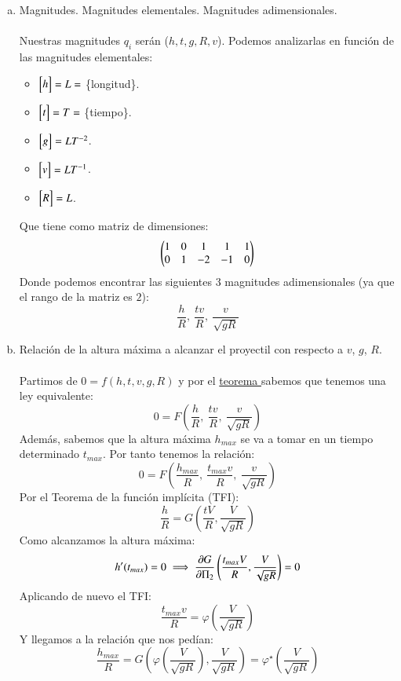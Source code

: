 \begin{ex}[H1.4]$ $
    \begin{enumerate}[a)]
        \item Magnitudes. Magnitudes elementales. Magnitudes adimensionales.\\\\
        Nuestras magnitudes $q_i$ serán ($h, t, g, R, v$). Podemos analizarlas en función de las magnitudes elementales:
        \begin{itemize}
            \item $\mx{h} = L = $ \{longitud\}.
            \item $\mx{t} = T = $ \{tiempo\}.
            \item $\mx{g} = L T^{-2}$.
            \item $\mx{v} = L T^{-1}$.
            \item $\mx{R} = L$.
        \end{itemize}
        Que tiene como matriz de dimensiones:
        $$
            \dmx{
                1 & 0 &  1 &  1 & 1\\
                0 & 1 & -2 & -1 & 0
            }
        $$
        Donde podemos encontrar las siguientes $3$ magnitudes adimensionales (ya que el rango de la matriz es $2$):
        $$
            \frac{h}{R},\ \frac{tv}{R},\ \frac{v}{\sqrt{gR}}
        $$
        \item Relación de la altura máxima a alcanzar el proyectil con respecto a $v$, $g$, $R$.\\\\
        Partimos de $0 = f(h, t, v, g, R)$ y por el \hyperref[thm:pi]{teorema \Pi} sabemos que tenemos una ley equivalente:
        $$
            0 = F\left(\frac{h}{R},\ \frac{tv}{R},\ \frac{v}{\sqrt{gR}}\right)
        $$
        Además, sabemos que la altura máxima $h_{max}$ se va a tomar en un tiempo determinado $t_{max}$. Por tanto tenemos la relación:
        $$
            0 = F\left(\frac{h_{max}}{R},\ \frac{t_{max}v}{R},\ \frac{v}{\sqrt{gR}}\right)
        $$
        Por el Teorema de la función implícita (TFI):
        $$
            \frac{h}{R} = G\left( \frac{tV}{R}, \frac{V}{\sqrt{gR}} \right)
        $$
        Como alcanzamos la altura máxima:
        $$
            h'(t_{max}) = 0 \implies \frac{\partial G}{\partial \Pi_2}\left( \frac{t_{max}V}{R}, \frac{V}{\sqrt{gR}} \right) = 0
        $$
        Aplicando de nuevo el TFI:
        $$
            \frac{t_{max} v}{R} = \varphi\left( \frac{V}{\sqrt{gR}} \right)
        $$
        Y llegamos a la relación que nos pedían:
        $$
            \frac{h_{max}}{R} = G\left( \varphi\left( \frac{V}{\sqrt{gR}} \right), \frac{V}{\sqrt{gR}} \right) = \varphi^{\star}\left( \frac{V}{\sqrt{gR}} \right)
        $$


\end{enumerate}
\end{ex}
